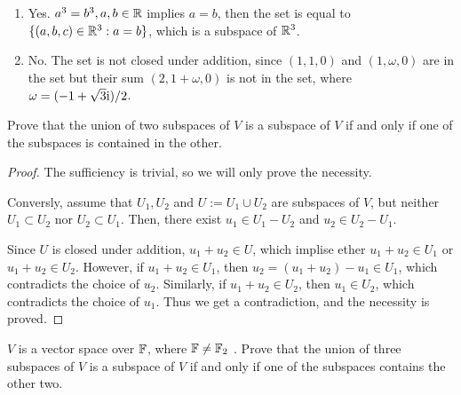 \documentclass{article}
\begin{document}
\begin{solution}
\begin{enumerate}[label=(\alph*)]
    \item Yes. $ a^3=b^3, a,b\in\mathbb{R} $ implies $ a=b $, then the set is equal to $\{(a, b, c) \in \mathbb{R}^3 : a = b\}$, which is a subspace of $\mathbb{R}^3$.
    \item No. The set is not closed under addition, since $ (1, 1, 0) $ and $ (1, \omega, 0) $ are in the set but their sum $ (2, 1+\omega, 0) $ is not in the set, where $ \omega=(-1+\sqrt{3}\mathrm{i})/2 $.
\end{enumerate}
\end{solution}

\begin{problem}[1C-12]
Prove that the union of two subspaces of $ V $ is a subspace of $ V $ if and only if one of the subspaces is contained in the other.
\end{problem}

\begin{proof}
The sufficiency is trivial, so we will only prove the necessity.\par 
Conversly, assume that $ U_1, U_2 $ and $ U:=U_1\cup U_2 $ are subspaces of $ V $, but neither $ U_1\subset U_2 $ nor $ U_2\subset U_1 $. Then, there exist $ u_1\in U_1 - U_2 $ and $ u_2\in U_2 - U_1 $.\par
Since $ U $ is closed under addition, $ u_1+u_2\in U $, which implise ether $ u_1+u_2\in U_1 $ or $ u_1+u_2\in U_2 $. However, if $ u_1+u_2\in U_1 $, then $ u_2=(u_1+u_2)-u_1\in U_1 $, which contradicts the choice of $ u_2 $. Similarly, if $ u_1+u_2\in U_2 $, then $ u_1\in U_2 $, which contradicts the choice of $ u_1 $. Thus we get a contradiction, and the necessity is proved. 
\end{proof}

\begin{problem}[1C-13]
$ V $ is a vector space over $ \mathbb{F} $, where $ \mathbb{F}\neq \mathbb{F}_2 $ . Prove that the union of three subspaces of $ V $ is a subspace of $ V $ if and only if one of the subspaces contains the other two.
\end{problem}
\end{document}
